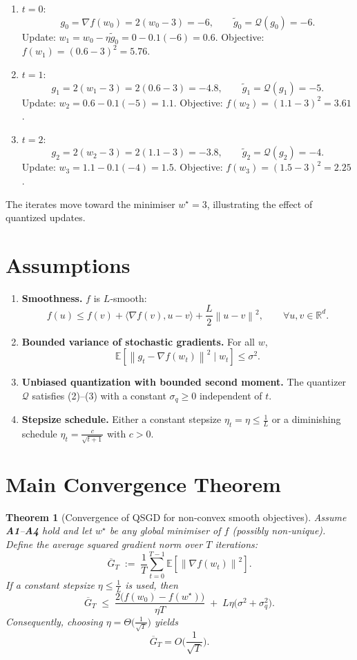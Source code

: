\documentclass{article}
\newcommand{\E}{\mathbb{E}}
\newcommand{\R}{\mathbb{R}}
\newcommand{\norm}[1]{\left\lVert #1\right\rVert}
\newcommand{\Qop}{\mathcal{Q}}
\newtheorem{theorem}{Theorem}
\begin{document}
\begin{enumerate}[label=Iteration \arabic*:, leftmargin=*, nosep]
\item $t=0$:
    \[
    g_0=\nabla f(w_0)=2(w_0-3)=-6,\qquad
    \tilde g_0=\Qop(g_0)= -6.
    \]
    Update:
    $w_1 = w_0-\eta\tilde g_0 = 0-0.1(-6)=0.6$.
    Objective:
    $f(w_1)=(0.6-3)^{2}=5.76$.
\item $t=1$:
    \[
    g_1=2(w_1-3)=2(0.6-3)=-4.8,\qquad
    \tilde g_1=\Qop(g_1)= -5.
    \]
    Update:
    $w_2 = 0.6-0.1(-5)=1.1$.
    Objective:
    $f(w_2)=(1.1-3)^{2}=3.61$.
\item $t=2$:
    \[
    g_2=2(w_2-3)=2(1.1-3)=-3.8,\qquad
    \tilde g_2=\Qop(g_2)= -4.
    \]
    Update:
    $w_3 = 1.1-0.1(-4)=1.5$.
    Objective:
    $f(w_3)=(1.5-3)^{2}=2.25$.
\end{enumerate}
The iterates move toward the minimiser $w^{\star}=3$, illustrating the effect of quantized updates.

\newpage
\section*{Assumptions}
\begin{enumerate}[label=\textbf{A\arabic*.}, leftmargin=*, nosep]
\item \textbf{Smoothness.} $f$ is $L$‑smooth:
\[
f(u)\le f(v)+\langle\nabla f(v),u-v\rangle+\frac{L}{2}\norm{u-v}^{2},
\qquad\forall u,v\in\R^{d}. \tag{A1}
\]
\item \textbf{Bounded variance of stochastic gradients.} For all $w$,
\[
\E\!\left[\norm{g_t-\nabla f(w_t)}^{2}\mid w_t\right]\le\sigma^{2}. \tag{A2}
\]
\item \textbf{Unbiased quantization with bounded second moment.} The quantizer $\Qop$ satisfies (2)–(3) with a constant $\sigma_q\ge0$ independent of $t$. 
\item \textbf{Stepsize schedule.} Either a constant stepsize $\eta_t=\eta\le\frac{1}{L}$ or a diminishing schedule $\eta_t=\frac{c}{\sqrt{t+1}}$ with $c>0$.
\end{enumerate}

\section*{Main Convergence Theorem}
\begin{theorem}[Convergence of QSGD for non‑convex smooth objectives]\label{thm:main}
Assume \textbf{A1}–\textbf{A4} hold and let $w^{\star}$ be any global minimiser of $f$ (possibly non‑unique).  
Define the average squared gradient norm over $T$ iterations:
\[
\overline{G}_T \;:=\; \frac{1}{T}\sum_{t=0}^{T-1}\E\!\left[\norm{\nabla f(w_t)}^{2}\right].
\]
If a constant stepsize $\eta\le \frac{1}{L}$ is used, then
\[
\overline{G}_T\;\le\;
\frac{2\big(f(w_0)-f(w^{\star})\big)}{\eta T}
\;+\;
L\eta\big(\sigma^{2}+\sigma_{q}^{2}\big).
\tag{4}
\]
Consequently, choosing $\eta = \Theta\!\big(\frac{1}{\sqrt{T}}\big)$ yields
\[
\overline{G}_T = O\!\Big(\frac{1}{\sqrt{T}}\Big).
\]
\end{theorem}
\end{document}
